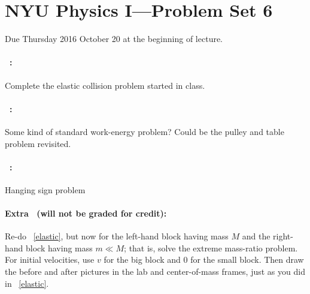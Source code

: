 \documentclass[12pt]{article}
\begin{document}
\section*{NYU Physics I---Problem Set 6}

Due Thursday 2016 October 20 at the beginning of lecture.

\paragraph{\problemname~\theproblem:}\label{elastic}%
Complete the elastic collision problem started in class.

\paragraph{\problemname~\theproblem:}%
Some kind of standard work-energy problem? Could be the pulley and table problem revisited.

\paragraph{\problemname~\theproblem:}%
Hanging sign problem

\paragraph{Extra \problemname\ (will not be graded for credit):}%
Re-do \problemname~\ref{elastic}, but now for the left-hand block having
mass $M$ and the right-hand block having mass $m\ll M$; that is, solve
the extreme mass-ratio problem. For initial velocities, use $v$ for
the big block and $0$ for the small block. Then draw the before and
after pictures in the lab and center-of-mass frames, just as you did
in \problemname~\ref{elastic}.
\end{document}
